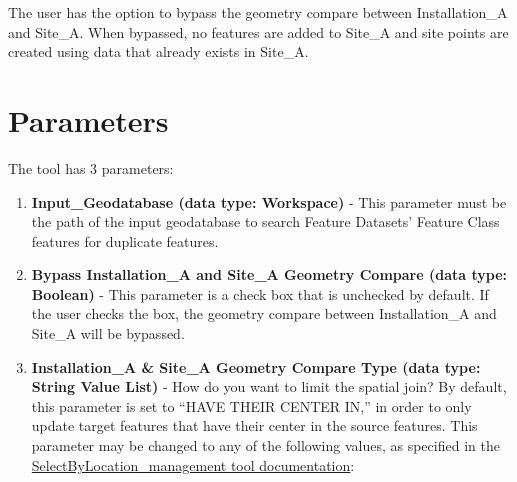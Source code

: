 \documentclass[openany]{book}
\providecommand{\tightlist}{%
  \setlength{\itemsep}{0pt}\setlength{\parskip}{0pt}}
\theoremstyle{definition}
\theoremstyle{definition}
\theoremstyle{definition}
\theoremstyle{remark}
\begin{document}
The user has the option to bypass the geometry compare between
Installation\_A and Site\_A. When bypassed, no features are added to
Site\_A and site points are created using data that already exists in
Site\_A.

\section{Parameters}\label{parameters-1}

The tool has 3 parameters:

\begin{enumerate}
\def\labelenumi{\arabic{enumi}.}
\tightlist
\item
  \textbf{Input\_Geodatabase (data type: Workspace)} - This parameter
  must be the path of the input geodatabase to search Feature Datasets'
  Feature Class features for duplicate features.\\
\item
  \textbf{Bypass Installation\_A and Site\_A Geometry Compare (data
  type: Boolean)} - This parameter is a check box that is unchecked by
  default. If the user checks the box, the geometry compare between
  Installation\_A and Site\_A will be bypassed.
\item
  \textbf{Installation\_A \& Site\_A Geometry Compare Type (data type:
  String Value List)} - How do you want to limit the spatial join? By
  default, this parameter is set to ``HAVE THEIR CENTER IN,'' in order
  to only update target features that have their center in the source
  features. This parameter may be changed to any of the following
  values, as specified in the
  \href{http://desktop.arcgis.com/en/arcmap/latest/tools/data-management-toolbox/select-layer-by-location.htm}{SelectByLocation\_management
  tool documentation}:


\end{enumerate}
\end{document}
